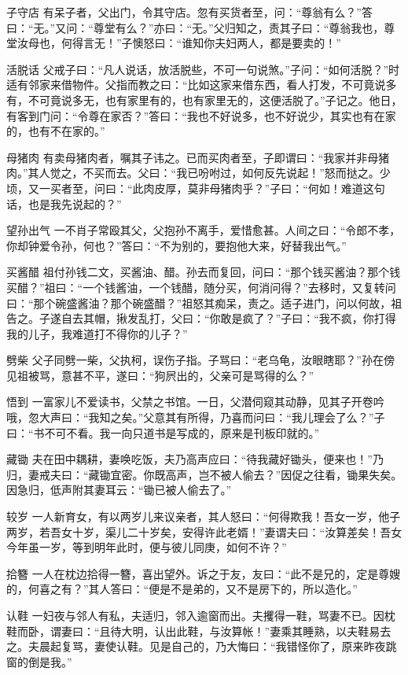 \documentclass[12pt,UTF8]{ctexbook}
\begin{document}
子守店
有呆子者，父出门，令其守店。忽有买货者至，问：“尊翁有么？”答曰：“无。”又问：“尊堂有么？”亦曰：“无。”父归知之，责其子曰：“尊翁我也，尊堂汝母也，何得言无！”子懊怒曰：“谁知你夫妇两人，都是要卖的！”

活脱话
父戒子曰：“凡人说话，放活脱些，不可一句说煞。”子问：“如何活脱？”时适有邻家来借物件。父指而教之曰：“比如这家来借东西，看人打发，不可竟说多有，不可竟说多无，也有家里有的，也有家里无的，这便活脱了。”子记之。他日，有客到门问：“令尊在家否？”答曰：“我也不好说多，也不好说少，其实也有在家的，也有不在家的。”

母猪肉
有卖母猪肉者，嘱其子讳之。已而买肉者至，子即谓曰：“我家并非母猪肉。”其人觉之，不买而去。父曰：“我已吩咐过，如何反先说起！”怒而挞之。少顷，又一买者至，问曰：“此肉皮厚，莫非母猪肉乎？”子曰：“何如！难道这句话，也是我先说起的？”

望孙出气
一不肖子常殴其父，父抱孙不离手，爱惜愈甚。人间之曰：“令郎不孝，你却钟爱令孙，何也？”答曰：“不为别的，要抱他大来，好替我出气。”

买酱醋
祖付孙钱二文，买酱油、醋。孙去而复回，问曰：“那个钱买酱油？那个钱买醋？”祖曰：“一个钱酱油，一个钱醋，随分买，何消问得？”去移时，又复转问曰：“那个碗盛酱油？那个碗盛醋？”祖怒其痴呆，责之。适子进门，问以何故，祖告之。子遂自去其帽，揪发乱打，父曰：“你敢是疯了？”子曰：“我不疯，你打得我的儿子，我难道打不得你的儿子？”

劈柴
父子同劈一柴，父执柯，误伤子指。子骂曰：“老乌龟，汝眼瞎耶？”孙在傍见祖被骂，意甚不平，遂曰：“狗屄出的，父亲可是骂得的么？”

悟到
一富家儿不爱读书，父禁之书馆。一日，父潜伺窥其动静，见其子开卷吟哦，忽大声曰：“我知之矣。”父意其有所得，乃喜而问曰：“我儿理会了么？”子曰：“书不可不看。我一向只道书是写成的，原来是刊板印就的。”

藏锄
夫在田中耦耕，妻唤吃饭，夫乃高声应曰：“待我藏好锄头，便来也！”乃归，妻戒夫曰：“藏锄宜密。你既高声，岂不被人偷去？”因促之往看，锄果失矣。因急归，低声附其妻耳云：“锄已被人偷去了。”

较岁
一人新育女，有以两岁儿来议亲者，其人怒曰：“何得欺我！吾女一岁，他子两岁，若吾女十岁，渠儿二十岁矣，安得许此老婿！”妻谓夫曰：“汝算差矣！吾女今年虽一岁，等到明年此时，便与彼儿同庚，如何不许？”

拾簪
一人在枕边拾得一簪，喜出望外。诉之于友，友曰：“此不是兄的，定是尊嫂的，何喜之有？”其人答曰：“便是不是弟的，又不是房下的，所以造化。”

认鞋
一妇夜与邻人有私，夫适归，邻入逾窗而出。夫攫得一鞋，骂妻不已。因枕鞋而卧，谓妻曰：“且待大明，认出此鞋，与汝算帐！”妻乘其睡熟，以夫鞋易去之。夫晨起复骂，妻使认鞋。见是自己的，乃大悔曰：“我错怪你了，原来昨夜跳窗的倒是我。”
\end{document}
